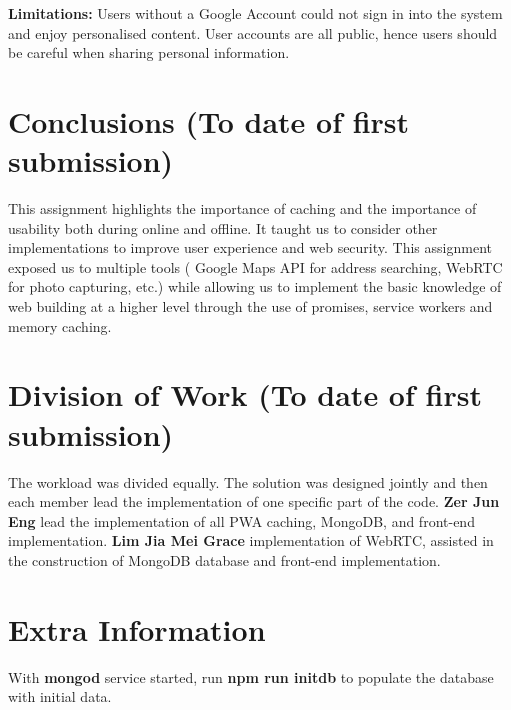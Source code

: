 \documentclass[11pt, a4paper]{article}
\begin{document}
\textbf{Limitations:} Users without a Google Account could not sign in into the system and enjoy
personalised content. User accounts are all public, hence users should be careful when sharing
personal information.

\section{Conclusions (To date of first submission)}
This assignment highlights the importance of caching and the importance of usability both during
online and offline. It taught us to consider other implementations to improve user experience and
web security. This assignment exposed us to multiple tools ( Google Maps API for address searching,
WebRTC for photo capturing, etc.) while allowing us to implement the basic knowledge of web building
at a higher level through the use of promises, service workers and memory caching.

\section{Division of Work (To date of first submission)}
The workload was divided equally. The solution was designed jointly and then each member lead the
implementation of one specific part of the code. \textbf{Zer Jun Eng} lead the implementation of all
PWA caching, MongoDB, and front-end implementation. \textbf{Lim Jia Mei Grace} implementation of
WebRTC, assisted in the construction of MongoDB database and front-end implementation.

\section{Extra Information}
With \textbf{mongod} service started, run \textbf{npm run initdb} to populate the database with
initial data.

\printbibliography
\end{document}
